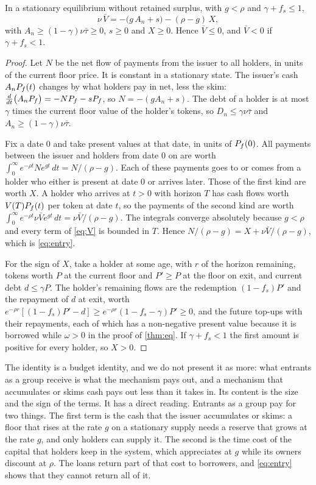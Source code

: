 \begin{theorem}\label{thm:entry}
In a stationary equilibrium without retained surplus, with $g<\rho$ and $\gamma+f_s\le1$,
\begin{equation}\label{eq:entry}
\nu\,\bar V=-\bigl(g\,A_n+s\bigr)-(\rho-g)\,X,
\end{equation}
with $A_n\ge(1-\gamma)\nu\bar\tau\ge0$, $s\ge0$ and $X\ge0$. Hence $\bar V\le0$, and $\bar V<0$ if $\gamma+f_s<1$.
\end{theorem}
\begin{proof}
Let $N$ be the net flow of payments from the issuer to all holders, in units of the current floor price. It is constant in a stationary state. The issuer's cash $A_nP_f(t)$ changes by what holders pay in net, less the skim: $\frac{d}{dt}\bigl(A_nP_f\bigr)=-NP_f-sP_f$, so $N=-(gA_n+s)$. The debt of a holder is at most $\gamma$ times the current floor value of the holder's tokens, so $D_n\le\gamma\nu\bar\tau$ and $A_n\ge(1-\gamma)\nu\bar\tau$.

Fix a date $0$ and take present values at that date, in units of $P_f(0)$. All payments between the issuer and holders from date $0$ on are worth $\int_0^\infty e^{-\rho t}Ne^{gt}\,dt=N/(\rho-g)$. Each of these payments goes to or comes from a holder who either is present at date $0$ or arrives later. Those of the first kind are worth $X$. A holder who arrives at $t>0$ with horizon $T$ has cash flows worth $V(T)P_f(t)$ per token at date $t$, so the payments of the second kind are worth $\int_0^\infty e^{-\rho t}\nu\bar Ve^{gt}\,dt=\nu\bar V/(\rho-g)$. The integrals converge absolutely because $g<\rho$ and every term of \eqref{eq:V} is bounded in $T$. Hence $N/(\rho-g)=X+\nu\bar V/(\rho-g)$, which is \eqref{eq:entry}.

For the sign of $X$, take a holder at some age, with $r$ of the horizon remaining, tokens worth $P$ at the current floor and $P'\ge P$ at the floor on exit, and current debt $d\le\gamma P$. The holder's remaining flows are the redemption $(1-f_s)P'$ and the repayment of $d$ at exit, worth $e^{-\rho r}[(1-f_s)P'-d]\ge e^{-\rho r}(1-f_s-\gamma)P'\ge0$, and the future top-ups with their repayments, each of which has a non-negative present value because it is borrowed while $\omega>0$ in the proof of \cref{thm:eq}. If $\gamma+f_s<1$ the first amount is positive for every holder, so $X>0$.
\end{proof}

The identity is a budget identity, and we do not present it as more: what entrants as a group receive is what the mechanism pays out, and a mechanism that accumulates or skims cash pays out less than it takes in. Its content is the size and the sign of the terms. It has a direct reading. Entrants as a group pay for two things. The first term is the cash that the issuer accumulates or skims: a floor that rises at the rate $g$ on a stationary supply needs a reserve that grows at the rate $g$, and only holders can supply it. The second is the time cost of the capital that holders keep in the system, which appreciates at $g$ while its owners discount at $\rho$. The loans return part of that cost to borrowers, and \eqref{eq:entry} shows that they cannot return all of it.

